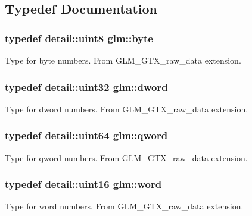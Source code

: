\subsection{Typedef Documentation}
\hypertarget{group__gtx__raw__data_gacd7fe1f2ad60a57f7d7ad4f1e6836efd}{
\subsubsection[{byte}]{\setlength{\rightskip}{0pt plus 5cm}typedef detail\-::uint8 {\bf glm\-::byte}}}\label{group__gtx__raw__data_gacd7fe1f2ad60a57f7d7ad4f1e6836efd}
Type for byte numbers. From G\-L\-M\-\_\-\-G\-T\-X\-\_\-raw\-\_\-data extension. \hypertarget{group__gtx__raw__data_ga1fc2589df6d44e923cd1820cf14805cf}{
\subsubsection[{dword}]{\setlength{\rightskip}{0pt plus 5cm}typedef detail\-::uint32 {\bf glm\-::dword}}}\label{group__gtx__raw__data_ga1fc2589df6d44e923cd1820cf14805cf}
Type for dword numbers. From G\-L\-M\-\_\-\-G\-T\-X\-\_\-raw\-\_\-data extension. \hypertarget{group__gtx__raw__data_ga32447af289e879589883c9b7e3be1246}{
\subsubsection[{qword}]{\setlength{\rightskip}{0pt plus 5cm}typedef detail\-::uint64 {\bf glm\-::qword}}}\label{group__gtx__raw__data_ga32447af289e879589883c9b7e3be1246}
Type for qword numbers. From G\-L\-M\-\_\-\-G\-T\-X\-\_\-raw\-\_\-data extension. \hypertarget{group__gtx__raw__data_ga5617a479d471021b5c773c5e969ba46d}{
\subsubsection[{word}]{\setlength{\rightskip}{0pt plus 5cm}typedef detail\-::uint16 {\bf glm\-::word}}}\label{group__gtx__raw__data_ga5617a479d471021b5c773c5e969ba46d}
Type for word numbers. From G\-L\-M\-\_\-\-G\-T\-X\-\_\-raw\-\_\-data extension. 